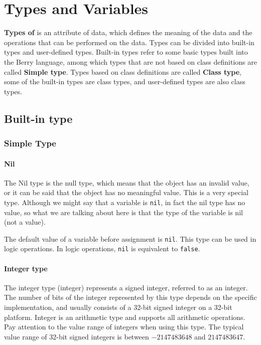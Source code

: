 \chapter {Types and Variables}

\textbf{Types of} is an attribute of data, which defines the meaning of the data and the operations that can be performed on the data. Types can be divided into built-in types and user-defined types. Built-in types refer to some basic types built into the Berry language, among which types that are not based on class definitions are called \textbf{Simple type}. Types based on class definitions are called \textbf{Class type}, some of the built-in types are class types, and user-defined types are also class types.

\section {Built-in type}

\subsection {Simple Type}

\subsubsection{Nil}

The Nil type is the null type, which means that the object has an invalid value, or it can be said that the object has no meaningful value. This is a very special type. Although we might say that a variable is \texttt{nil}, in fact the nil type has no value, so what we are talking about here is that the type of the variable is nil (not a value).

The default value of a variable before assignment is \texttt{nil}. This type can be used in logic operations. In logic operations, \texttt{nil} is equivalent to \texttt{false}.

\subsubsection {Integer type}

The integer type (integer) represents a signed integer, referred to as an integer. The number of bits of the integer represented by this type depends on the specific implementation, and usually consists of a 32-bit signed integer on a 32-bit platform. Integer is an arithmetic type and supports all arithmetic operations. Pay attention to the value range of integers when using this type. The typical value range of 32-bit signed integers is between $-2147483648$ and $2147483647$.

